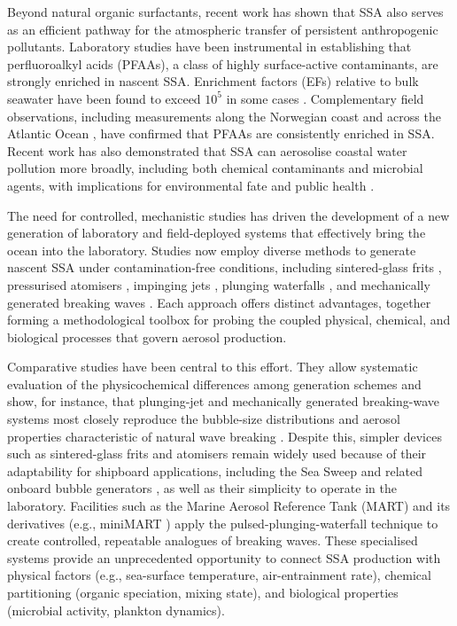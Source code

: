 \documentclass[ProofPDF]{./Styles/Jnls-Template-V3}
\begin{document}
Beyond natural organic surfactants, recent work has shown that SSA also serves as an efficient pathway for the atmospheric transfer of persistent anthropogenic pollutants. Laboratory studies have been instrumental in establishing that perfluoroalkyl acids (PFAAs), a class of highly surface-active contaminants, are strongly enriched in nascent SSA. Enrichment factors (EFs) relative to bulk seawater have been found to exceed $10^5$ in some cases \citep[e.g.][]{Johansson2019,Sha2020}. Complementary field observations, including measurements along the Norwegian coast \citep{Sha2021} and across the Atlantic Ocean \citep{Sha2024}, have confirmed that PFAAs are consistently enriched in SSA. Recent work has also demonstrated that SSA can aerosolise coastal water pollution more broadly, including both chemical contaminants and microbial agents, with implications for environmental fate and public health \citep{Pendergraft2023}.

The need for controlled, mechanistic studies has driven the development of a new generation of laboratory and field-deployed systems that effectively bring the ocean into the laboratory. Studies now employ diverse methods to generate nascent SSA under contamination-free conditions, including sintered-glass frits \citep[e.g.][]{Maartensson2003,Sellegri2006}, pressurised atomisers \citep[e.g.][]{Svenningsson2006}, impinging jets \citep[e.g.][]{Salter2014}, plunging waterfalls \citep[e.g.][]{Stokes2013}, and mechanically generated breaking waves \citep[e.g.][]{Prather2013}. Each approach offers distinct advantages, together forming a methodological toolbox for probing the coupled physical, chemical, and biological processes that govern aerosol production.

Comparative studies have been central to this effort. They allow systematic evaluation of the physicochemical differences among generation schemes and show, for instance, that plunging-jet and mechanically generated breaking-wave systems most closely reproduce the bubble-size distributions and aerosol properties characteristic of natural wave breaking \citep[e.g.][]{Collins2014}. Despite this, simpler devices such as sintered-glass frits and atomisers remain widely used because of their adaptability for shipboard applications, including the Sea Sweep and related onboard bubble generators \citep[e.g.][]{Bates2012}, as well as their simplicity to operate in the laboratory. Facilities such as the Marine Aerosol Reference Tank (MART) \citep{Stokes2013} and its derivatives (e.g., miniMART \citep{Stokes2016}) apply the pulsed-plunging-waterfall technique to create controlled, repeatable analogues of breaking waves. These specialised systems provide an unprecedented opportunity to connect SSA production with physical factors (e.g., sea-surface temperature, air-entrainment rate), chemical partitioning (organic speciation, mixing state), and biological properties (microbial activity, plankton dynamics).
\end{document}
